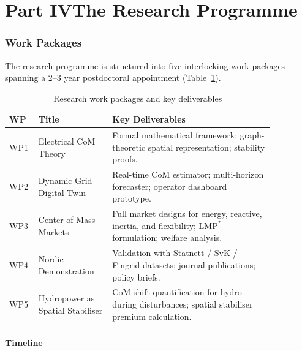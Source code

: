 \documentclass[12pt, a4paper]{article}
\begin{document}
\part*{Part IV\quad The Research Programme}

\section{Work Packages}
\label{sec:workpackages}

The research programme is structured into five interlocking work packages
spanning a 2--3 year postdoctoral appointment (Table~\ref{tab:wps}).

\begin{table}[htbp]
  \centering
  \caption{Research work packages and key deliverables}
  \label{tab:wps}
  \begin{tabular}{p{0.06\linewidth} p{0.25\linewidth} p{0.55\linewidth}}
    \toprule
    \textbf{WP} & \textbf{Title} & \textbf{Key Deliverables} \\
    \midrule
    WP1 & Electrical CoM Theory
      & Formal mathematical framework; graph-theoretic spatial
        representation; stability proofs. \\[4pt]
    WP2 & Dynamic Grid Digital Twin
      & Real-time CoM estimator; multi-horizon forecaster;
        operator dashboard prototype. \\[4pt]
    WP3 & Center-of-Mass Markets
      & Full market designs for energy, reactive, inertia, and
        flexibility; $\mathrm{LMP}^*$ formulation; welfare analysis. \\[4pt]
    WP4 & Nordic Demonstration
      & Validation with Statnett / SvK / Fingrid datasets;
        journal publications; policy briefs. \\[4pt]
    WP5 & Hydropower as Spatial Stabiliser
      & CoM shift quantification for hydro during disturbances;
        spatial stabiliser premium calculation. \\
    \bottomrule
  \end{tabular}
\end{table}

\subsection{Timeline}
\end{document}
